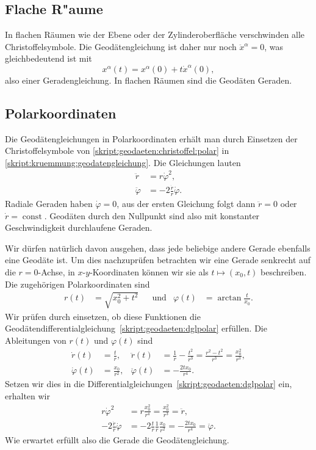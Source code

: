 \subsection{Flache R"aume}
In flachen Räumen wie der Ebene oder der Zylinderoberfläche verschwinden
alle Christoffelsymbole.
Die Geodätengleichung ist daher nur noch
$\ddot x^\alpha=0$, was gleichbedeutend ist mit
\[
x^\alpha(t)=x^\alpha(0) + t \dot x^\alpha(0),
\]
also einer Geradengleichung.
In flachen Räumen sind die Geodäten Geraden.

\subsection{Polarkoordinaten}
Die Geodätengleichungen in Polarkoordinaten erhält man durch
Einsetzen der Christoffelsymbole von
\eqref{skript:geodaeten:christoffel:polar}
in
\eqref{skript:kruemmung:geodatengleichung}.
Die Gleichungen lauten
\begin{equation}
\begin{aligned}
\ddot r &= r\dot \varphi^2,
\\
\ddot \varphi &= -2\frac{\dot r}{r}\dot\varphi.
\end{aligned}
\label{skript:geodaeten:dglpolar}
\end{equation}
Radiale Geraden haben $\dot\varphi=0$, aus der ersten Gleichung folgt dann
$\ddot r=0$ oder $\dot r=\operatorname{const}$.
Geodäten durch den Nullpunkt sind also mit konstanter Geschwindigkeit
durchlaufene Geraden.

Wir dürfen natürlich davon ausgehen, dass jede beliebige andere Gerade
ebenfalls eine Geodäte ist.
Um dies nachzuprüfen betrachten wir eine Gerade senkrecht auf die
$r=0$-Achse, in $x$-$y$-Koordinaten können wir sie als
$t\mapsto (x_0,t)$ beschreiben.
Die zugehörigen Polarkoordinaten sind
\[
\begin{aligned}
r(t)&=\sqrt{x_0^2+t^2}
&&\text{und}&
\varphi(t)&=\arctan\frac{t}{x_0}.
\end{aligned}
\]
Wir prüfen durch einsetzen, ob diese Funktionen die
Geodätendifferentialgleichung~\eqref{skript:geodaeten:dglpolar}
erfüllen.
Die Ableitungen von $r(t)$ und $\varphi(t)$ sind
\begin{align*}
\dot r(t)
&=\frac{t}{r},
&
\ddot r(t)
&=
\frac{1}{r}-\frac{t^2}{r^3}
=
\frac{r^2-t^2}{r^3}
=
\frac{x_0^2}{r^3},
\\
\dot\varphi(t)
&=
\frac{x_0}{r^2},
&
\ddot\varphi(t)
&=
-\frac{2tx_0}{r^4}.
\end{align*}
Setzen wir dies in die
Differentialgleichungen~\eqref{skript:geodaeten:dglpolar}
ein, erhalten wir
\begin{align*}
r\dot\varphi^2
&=
r\frac{x_0^2}{r^4}
=
\frac{x_0^2}{r^3}
=
\ddot r,
\\
-2\frac{\dot r}{r}\dot\varphi
&=
-2\frac{t}{r}\frac1{r}\frac{x_0}{r^2}
=
-\frac{2tx_0}{r^4}
=
\ddot\varphi.
\end{align*}
Wie erwartet erfüllt also die Gerade die Geodätengleichung.

